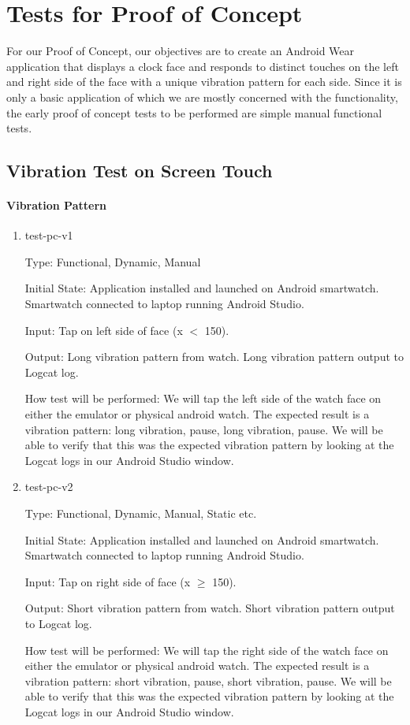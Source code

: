 \section{Tests for Proof of Concept}
For our Proof of Concept, our objectives are to create an Android Wear application that displays a clock face and responds to distinct touches on the left and right side of the face with a unique vibration pattern for each side. Since it is only a basic application of which we are mostly concerned with the functionality, the early proof of concept tests to be performed are simple manual functional tests.
\subsection{Vibration Test on Screen Touch}
		
\paragraph{Vibration Pattern}

\begin{enumerate}

\item{test-pc-v1\\}

Type: Functional, Dynamic, Manual
					
Initial State: Application installed and launched on Android smartwatch. Smartwatch connected to laptop running Android Studio.
					
Input: Tap on left side of face (x $<$ 150).
					
Output: Long vibration pattern from watch.
		Long vibration pattern output to Logcat log.
					
How test will be performed: We will tap the left side of the watch face on either the emulator or physical android watch. The expected result is a vibration pattern: long vibration, pause, long vibration, pause. We will be able to verify that this was the expected vibration pattern by looking at the Logcat logs in our Android Studio window.
					
\item{test-pc-v2\\}

Type: Functional, Dynamic, Manual, Static etc.
					
Initial State: Application installed and launched on Android smartwatch. Smartwatch connected to laptop running Android Studio.
					
Input: Tap on right side of face (x $\geq$ 150).
					
Output: Short vibration pattern from watch.
		Short vibration pattern output to Logcat log.
					
How test will be performed: We will tap the right side of the watch face on either the emulator or physical android watch. The expected result is a vibration pattern: short vibration, pause, short vibration, pause. We will be able to verify that this was the expected vibration pattern by looking at the Logcat logs in our Android Studio window.

\end{enumerate}
	

